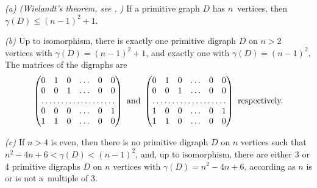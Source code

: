 \documentclass[11pt]{llncs}
\begin{document}
\begin{theorem}
\label{dulmage}
\emph{(a) (Wielandt's theorem, see \cite{Wi50,DM62}, \cite[Theorem~1]{DM64})}
If a primitive graph $D$ has $n$~vertices, then  $\gamma(D)\le(n-1)^2+1$.

\emph{(b) \cite[Theorem~6 and Corollary 4]{DM64}} Up to isomorphism, there is
exactly one primitive digraph $D$ on $n>2$ vertices with $\gamma(D)=(n-1)^2+1$,
and exactly one with $\gamma(D)=(n-1)^2$. The matrices of the digraphs are
\begin{equation}
\label{wielandt}
\begin{pmatrix}
0 & 1 & 0 & \dots & 0 & 0\\
0 & 0 & 1 & \dots & 0 & 0\\
\hdotsfor{6}\\
0 & 0 & 0 & \dots & 0 & 1\\
1 & 1 & 0 & \dots & 0 & 0
\end{pmatrix} \text{ and }
\begin{pmatrix}
0 & 1 & 0 & \dots & 0 & 0\\
0 & 0 & 1 & \dots & 0 & 0\\
\hdotsfor{6}\\
1 & 0 & 0 & \dots & 0 & 1\\
1 & 1 & 0 & \dots & 0 & 0
\end{pmatrix}
\text{ respectively.}
\end{equation}

\emph{(c) \cite[Theorem~7]{DM64}} If $n>4$ is even, then there is no
primitive digraph $D$ on $n$ vertices such that $n^2-4n+6<\gamma(D)<(n-1)^2$,
and, up to isomorphism, there are either $3$ or $4$ primitive
digraphs $D$ on $n$ vertices with $\gamma(D)=n^2-4n+6$, according
as $n$ is or is not a~multiple of $3$.


\end{theorem}
\end{document}
